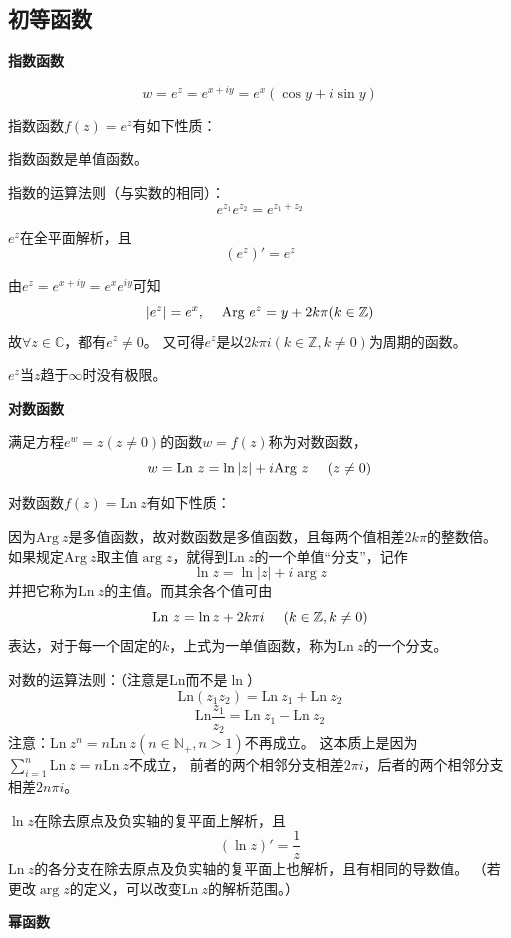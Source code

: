 \documentclass[a4paper,12pt]{article}
\begin{document}
\subsection{初等函数}

\noindent
\textbf{指数函数}

$$
w=e^z=e^{x+iy}=e^x\left(\cos y+i\sin y\right)
$$

指数函数$f\left(z\right)=e^z$有如下性质：

指数函数是单值函数。

指数的运算法则（与实数的相同）：
$$
e^{z_1}e^{z_2}=e^{z_1+z_2}
$$

$e^z$在全平面解析，且
$$
\left(e^z\right)'=e^z
$$

由$e^z=e^{x+iy}=e^xe^{iy}$可知
$$
\left|e^z\right|=e^x,\kern 12pt
\text{Arg}\ e^z=y+2k\pi(k\in\mathbb{Z})
$$
故$\forall z\in\mathbb{C}$，都有$e^z\ne0$。
又可得$e^z$是以$2k\pi i(k\in\mathbb{Z},k\ne0)$为周期的函数。

$e^z$当$z$趋于$\infty$时没有极限。

\noindent
\textbf{对数函数}

满足方程$e^w=z\left(z\ne0\right)$的函数$w=f\left(z\right)$称为对数函数，
$$
w=\text{Ln}\ z=\ln\left|z\right|+i\text{Arg}\ z\kern 12pt \left(z\ne0\right)
$$

对数函数$f\left(z\right)=\text{Ln}\ z$有如下性质：

因为$\text{Arg}\ z$是多值函数，故对数函数是多值函数，且每两个值相差$2k\pi$的整数倍。
如果规定$\text{Arg}\ z$取主值$\arg z$，就得到$\text{Ln}\ z$的一个单值“分支”，记作
$$
\ln z=\ln\left|z\right|+i\arg z
$$
并把它称为$\text{Ln}\ z$的主值。而其余各个值可由
$$
\text{Ln}\ z=\ln z+2k\pi i\kern 12pt \left(k\in\mathbb{Z},k\ne0\right)
$$
表达，对于每一个固定的$k$，上式为一单值函数，称为$\text{Ln}\ z$的一个分支。

对数的运算法则：（注意是$\text{Ln}$而不是$\ln$）
$$
\text{Ln}\left(z_1z_2\right)=\text{Ln}\ z_1+\text{Ln}\ z_2
$$
$$
\text{Ln}\frac{z_1}{z_2}=\text{Ln}\ z_1-\text{Ln}\ z_2
$$
注意：$\text{Ln}\ z^n=n\text{Ln}\ z\left(n\in\mathbb{N}_+,n>1\right)$不再成立。
这本质上是因为$\sum_{i=1}^n\text{Ln}\ z=n\text{Ln}\ z$不成立，
前者的两个相邻分支相差$2\pi i$，后者的两个相邻分支相差$2n\pi i$。

$\ln z$在除去原点及负实轴的复平面上解析，且
$$
\left(\ln z\right)'=\frac1z
$$
$\text{Ln}\ z$的各分支在除去原点及负实轴的复平面上也解析，且有相同的导数值。
（若更改$\arg z$的定义，可以改变$\text{Ln}\ z$的解析范围。）

\noindent
\textbf{幂函数}
\end{document}
